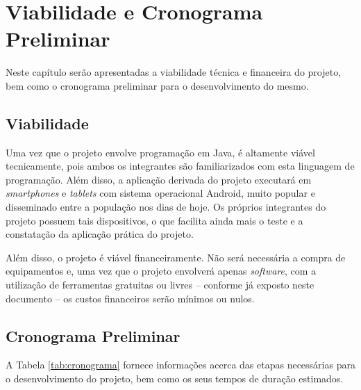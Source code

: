 \chapter{Viabilidade e Cronograma Preliminar}\label{cap:viabilidade}

Neste capítulo serão apresentadas a viabilidade técnica e financeira do projeto, bem como o cronograma preliminar para o desenvolvimento do mesmo.

\section{Viabilidade}\label{s:viabilidade}

Uma vez que o projeto envolve programação em Java, é altamente viável tecnicamente, pois ambos os integrantes são familiarizados com esta linguagem de programação. Além disso, a aplicação derivada do projeto executará em \textit{smartphones} e \textit{tablets} com sistema operacional Android, muito popular e disseminado entre a população nos dias de hoje. Os próprios integrantes do projeto possuem tais dispositivos, o que facilita ainda mais o teste e a constatação da aplicação prática do projeto.

Além disso, o projeto é viável financeiramente. Não será necessária a compra de equipamentos e, uma vez que o projeto envolverá apenas \textit{software}, com a utilização de ferramentas gratuitas ou livres -- conforme já exposto neste documento -- os custos financeiros serão mínimos ou nulos.

\newpage

\section{Cronograma Preliminar}\label{s:cronograma}

A Tabela \ref{tab:cronograma} fornece informações acerca das etapas necessárias para o desenvolvimento do projeto, bem como os seus tempos de duração estimados.

